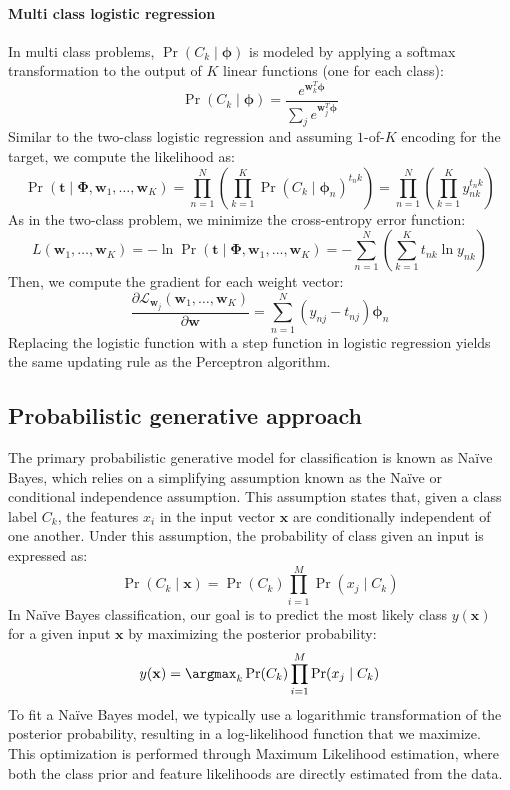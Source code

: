 \paragraph*{Multi class logistic regression}
In multi class problems, $\Pr(C_k\mid\boldsymbol{\phi})$ is modeled by applying a softmax transformation to the output of $K$ linear functions (one for each class):
\[\Pr(C_k\mid\boldsymbol{\phi})=\dfrac{e^{\textbf{w}_k^T\boldsymbol{\phi}}}{\sum_j e^{\textbf{w}_j^T\boldsymbol{\phi}}}\]
Similar to the two-class logistic regression and assuming $1$-of-$K$  encoding for the target, we compute the likelihood as:
\[\Pr(\textbf{t}\mid\boldsymbol{\Phi},\textbf{w}_1,\dots,\textbf{w}_K)=\prod_{n=1}^N \left( \prod_{k=1}^K \Pr{(C_k\mid\boldsymbol{\phi}_n)}^{t_n k} \right)=\prod_{n=1}^N \left( \prod_{k=1}^K y^{t_n k}_{nk} \right)\]
As in the two-class problem, we minimize the cross-entropy error function:
\[L(\textbf{w}_1,\dots,\textbf{w}_K)=-\ln \Pr(\textbf{t}\mid\boldsymbol{\Phi},\textbf{w}_1,\dots,\textbf{w}_K)=-\sum_{n=1}^N \left(\sum_{k=1}^K t_{nk}\ln y_{nk} \right)\]
Then, we compute the gradient for each weight vector:
\[\dfrac{\partial\mathcal{L}_{\textbf{w}_j}(\textbf{w}_1,\dots,\textbf{w}_K)}{\partial\mathbf{w}} =\sum_{n=1}^N\left( y_{nj}-t_{nj} \right) \boldsymbol{\phi}_n\]
Replacing the logistic function with a step function in logistic regression yields the same updating rule as the Perceptron algorithm.

\subsection{Probabilistic generative approach}
The primary probabilistic generative model for classification is known as Naïve Bayes, which relies on a simplifying assumption known as the Naïve or conditional independence assumption. 
This assumption states that, given a class label $C_k$, the features $x_i$ in the input vector $\mathbf{x}$ are conditionally independent of one another.
Under this assumption, the probability of class given an input is expressed as: 
\[\Pr(C_k\mid\mathbf{x})=\Pr(C_k)\prod_{i=1}^M\Pr(x_j\mid C_k)\]
In Naïve Bayes classification, our goal is to predict the most likely class $y(\mathbf{x})$ for a given input $\mathbf{x}$ by maximizing the posterior probability:
\[y(\mathbf{x})=\argmax_k\Pr(C_k)\prod_{i=1}^M\Pr(x_j\mid C_k)\]
To fit a Naïve Bayes model, we typically use a logarithmic transformation of the posterior probability, resulting in a log-likelihood function that we maximize. 
This optimization is performed through Maximum Likelihood estimation, where both the class prior and feature likelihoods are directly estimated from the data.

